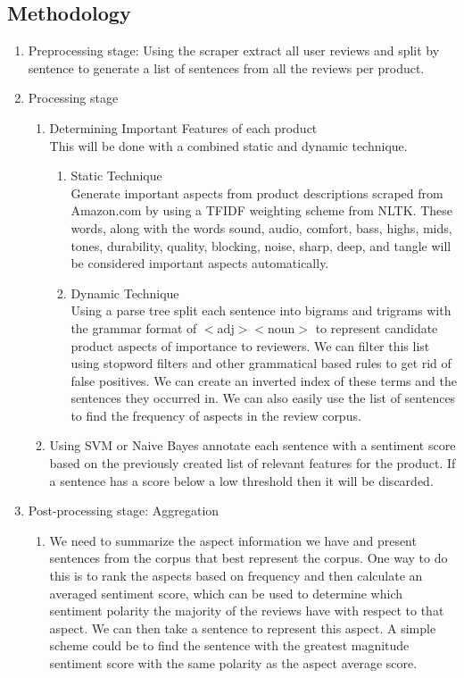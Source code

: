 \documentclass{article}
\begin{document}
\subsection{Methodology}
\begin{enumerate}
\item Preprocessing stage: 
\newline Using the scraper extract all user reviews and split by sentence to generate a list of sentences from all the reviews per product.

\item Processing stage
	\begin{enumerate} [label* = \arabic*.]
	\item Determining Important Features of each product \\
	This will be done with a combined static and dynamic technique.
		\begin{enumerate} [label* = \arabic*.]
	\item Static Technique \\
	 Generate important aspects from product descriptions scraped from Amazon.com by using a TFIDF weighting scheme from NLTK. These words, along with the words sound, audio, comfort, bass, highs, mids, tones, durability, quality, blocking, noise, sharp, deep, and tangle will be considered important aspects automatically.
	\item Dynamic Technique \\
	 Using a parse tree split each sentence into bigrams and trigrams with the grammar format of $<$adj$><$noun$>$ to represent candidate product aspects of importance to reviewers. We can filter this list using stopword filters and other grammatical based rules to get rid of false positives. We can create an inverted index of these terms and the sentences they occurred in. We can also easily use the list of sentences to find the frequency of aspects in the review corpus.
	\end{enumerate}
		\item Using SVM or Naive Bayes annotate each sentence with a sentiment score based on the previously created list of relevant features for the product. If a sentence has a score below a low threshold then it will be discarded.
	\end{enumerate}
\item Post-processing stage: Aggregation
	\begin{enumerate}[label* = \arabic*.]
	\item We need to summarize the aspect information we have and present sentences from the corpus that best represent the corpus. One way to do this is to rank the aspects based on frequency and then calculate an averaged sentiment score, which can be used to determine which sentiment polarity the majority of the reviews have with respect to that aspect. We can then take a sentence to represent this aspect. A simple scheme could be to find the sentence with the greatest magnitude sentiment score with the same polarity as the aspect average score.
	\end{enumerate}
\end{enumerate}
\end{document}
